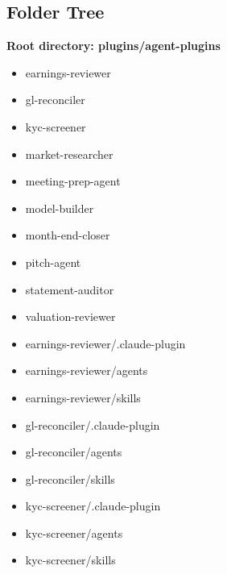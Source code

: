 \documentclass[11pt]{article}
\begin{document}
\subsection{Folder Tree}
\textbf{Root directory: plugins/agent-plugins}
\begin{itemize}[leftmargin=*,itemsep=1pt,topsep=2pt]
\item \hspace*{0.0em}earnings-reviewer
\item \hspace*{0.0em}gl-reconciler
\item \hspace*{0.0em}kyc-screener
\item \hspace*{0.0em}market-researcher
\item \hspace*{0.0em}meeting-prep-agent
\item \hspace*{0.0em}model-builder
\item \hspace*{0.0em}month-end-closer
\item \hspace*{0.0em}pitch-agent
\item \hspace*{0.0em}statement-auditor
\item \hspace*{0.0em}valuation-reviewer
\item \hspace*{0.9em}earnings-reviewer/.claude-plugin
\item \hspace*{0.9em}earnings-reviewer/agents
\item \hspace*{0.9em}earnings-reviewer/skills
\item \hspace*{0.9em}gl-reconciler/.claude-plugin
\item \hspace*{0.9em}gl-reconciler/agents
\item \hspace*{0.9em}gl-reconciler/skills
\item \hspace*{0.9em}kyc-screener/.claude-plugin
\item \hspace*{0.9em}kyc-screener/agents
\item \hspace*{0.9em}kyc-screener/skills

\end{itemize}
\end{document}

